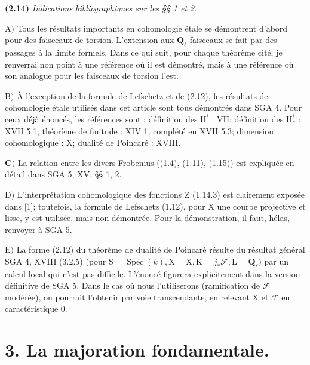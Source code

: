 \documentclass[10pt,leqno]{article}
\begin{document}
\noindent \textbf{(2.14)} \emph{Indications bibliographiques sur les §§ 1 et 2.}\par

\noindent \(\mathrm{A})\) Tous les résultats importants en cohomologie étale se démontrent d’abord pour des faisceaux de torsion. L’extension aux \(\mathbf{Q}_{\ell }\)-faisceaux se fait par des passages à la limite formels. Dans ce qui suit, pour chaque théorème cité, je renverrai non point à une référence où il est démontré, mais à une référence où son analogue pour les faisceaux de torsion l’est.\par

\noindent \(\mathrm{B})\) À l’exception de la formule de Lefschetz et de (2.12), les résultats de cohomologie étale utilisés dans cet article sont tous démontrés dans SGA 4. Pour ceux déjà énoncés, les références sont : définition des \(\mathrm{H}^{i}\) : VII; définition des \(\mathrm{H}_{c}^{i}\) : XVII 5.1; théorème de finitude : XIV 1, complété en XVII 5.3; dimension cohomologique : \(\mathrm{X}\); dualité de Poincaré : XVIII.\par

\noindent \(\mathbf{C})\) La relation entre les divers Frobenius ((1.4), (1.11), (1.15)) est expliquée en détail dans SGA 5, XV, §§ 1, 2.\par

\noindent \(\mathrm{D})\) L’interprétation cohomologique des fonctions Z (1.14.3) est clairement exposée dans [1]; toutefois, la formule de Lefschetz (1.12), pour \(\mathrm{X}\) une courbe projective et lisse, y est utilisée, mais non démontrée. Pour la démonstration, il faut, hélas, renvoyer à SGA 5.\par

\noindent \(\mathrm{E})\) La forme (2.12) du théorème de dualité de Poincaré résulte du résultat général SGA 4, XVIII (3.2.5) (pour \(\mathrm{S}=\operatorname{Spec}(k), \mathrm{X}=\mathrm{X}, \mathrm{K}=j_{*}\mathcal{F} , \mathrm{L}=\mathbf{Q}_{\ell })\) par un calcul local qui n’est pas difficile. L’énoncé figurera explicitement dans la version définitive de SGA 5. Dans le cas où nous l’utiliserons (ramification de \(\mathcal{F} \) modérée), on pourrait l’obtenir par voie transcendante, en relevant \(\mathrm{X}\) et \(\mathcal{F} \) en caractéristique 0.\par

\section*{3. La majoration fondamentale.}
\end{document}
